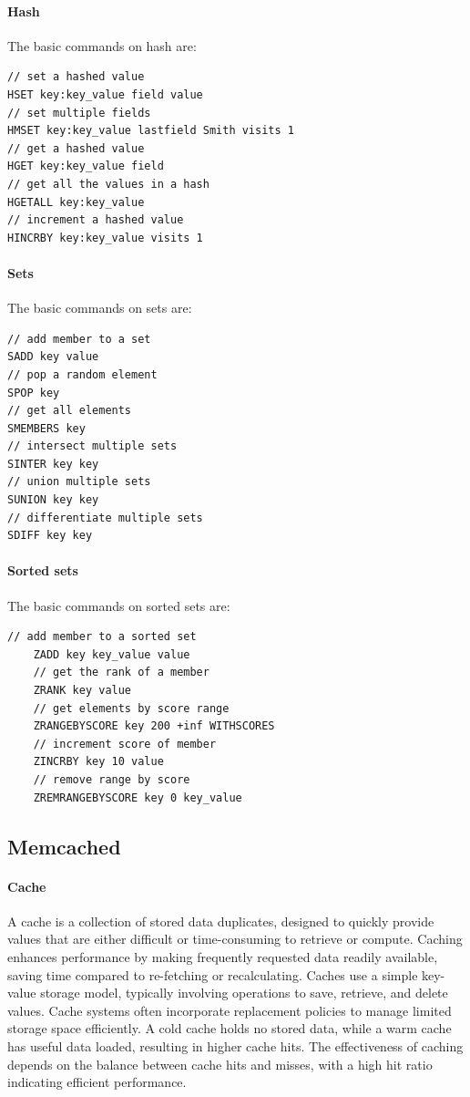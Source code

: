 \paragraph*{Hash}
The basic commands on hash are: 
\begin{lstlisting}[style=Java]
// set a hashed value
HSET key:key_value field value 
// set multiple fields
HMSET key:key_value lastfield Smith visits 1
// get a hashed value
HGET key:key_value field
// get all the values in a hash 
HGETALL key:key_value
// increment a hashed value
HINCRBY key:key_value visits 1
\end{lstlisting}

\paragraph*{Sets}
The basic commands on sets are: 
\begin{lstlisting}[style=Java]
// add member to a set
SADD key value
// pop a random element 
SPOP key
// get all elements
SMEMBERS key
// intersect multiple sets
SINTER key key
// union multiple sets
SUNION key key
// differentiate multiple sets
SDIFF key key
\end{lstlisting}

\paragraph*{Sorted sets}
The basic commands on sorted sets are: 
\begin{lstlisting}[style=Java]
    // add member to a sorted set
    ZADD key key_value value
    // get the rank of a member 
    ZRANK key value
    // get elements by score range 
    ZRANGEBYSCORE key 200 +inf WITHSCORES
    // increment score of member
    ZINCRBY key 10 value 
    // remove range by score 
    ZREMRANGEBYSCORE key 0 key_value
\end{lstlisting}

\subsection{Memcached}

\paragraph*{Cache}
A cache is a collection of stored data duplicates, designed to quickly provide values that are either difficult or time-consuming to retrieve or compute. 
Caching enhances performance by making frequently requested data readily available, saving time compared to re-fetching or recalculating. 
Caches use a simple key-value storage model, typically involving operations to save, retrieve, and delete values. 
Cache systems often incorporate replacement policies to manage limited storage space efficiently. 
A cold cache holds no stored data, while a warm cache has useful data loaded, resulting in higher cache hits. 
The effectiveness of caching depends on the balance between cache hits and misses, with a high hit ratio indicating efficient performance.

